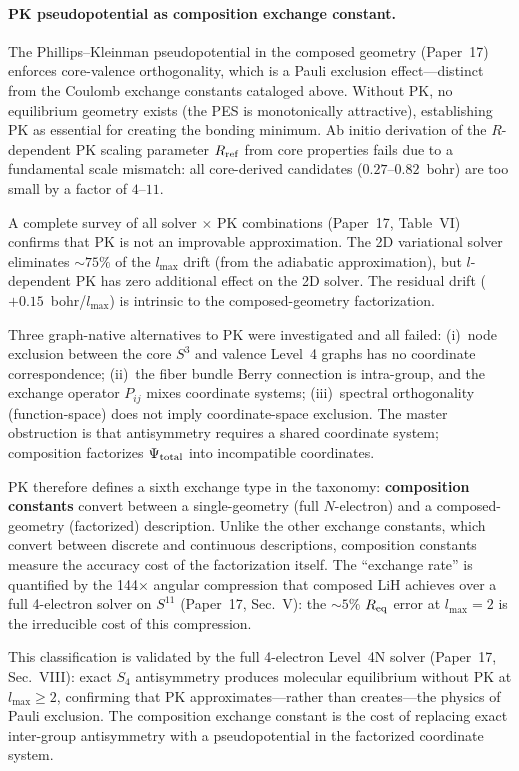 \documentclass[aps,pra,twocolumn,superscriptaddress,longbibliography]{revtex4-2}
\begin{document}
\paragraph{PK pseudopotential as composition exchange constant.}
The Phillips--Kleinman pseudopotential in the composed geometry
(Paper~17) enforces core-valence orthogonality, which is a
Pauli exclusion effect---distinct from the Coulomb exchange
constants cataloged above.  Without PK, no equilibrium
geometry exists (the PES is monotonically attractive), establishing
PK as essential for creating the bonding minimum.  Ab initio
derivation of the $R$-dependent PK scaling parameter $R_{\rm ref}$
from core properties fails due to a fundamental scale mismatch:
all core-derived candidates ($0.27$--$0.82$~bohr) are too small
by a factor of $4$--$11$.

A complete survey of all solver $\times$ PK combinations
(Paper~17, Table~VI) confirms that PK is not an improvable
approximation.  The 2D variational solver eliminates ${\sim}75\%$
of the $l_{\max}$ drift (from the adiabatic approximation), but
$l$-dependent PK has zero additional effect on the 2D solver.
The residual drift ($+0.15$~bohr/$l_{\max}$) is intrinsic to
the composed-geometry factorization.

Three graph-native alternatives to PK were investigated and all
failed: (i)~node exclusion between the core $S^3$ and valence
Level~4 graphs has no coordinate correspondence;
(ii)~the fiber bundle Berry connection is intra-group, and the
exchange operator $P_{ij}$ mixes coordinate systems;
(iii)~spectral orthogonality (function-space) does not imply
coordinate-space exclusion.  The master obstruction is that
antisymmetry requires a shared coordinate system; composition
factorizes $\Psi_{\rm total}$ into incompatible coordinates.

PK therefore defines a sixth exchange type in the taxonomy:
\textbf{composition constants} convert between a single-geometry
(full $N$-electron) and a composed-geometry (factorized) description.
Unlike the other exchange constants, which convert between discrete
and continuous descriptions, composition constants measure the
accuracy cost of the factorization itself.  The ``exchange rate''
is quantified by the 144$\times$ angular compression that composed
LiH achieves over a full 4-electron solver on $S^{11}$
(Paper~17, Sec.~V): the ${\sim}5\%$ $R_{\rm eq}$ error at
$l_{\max} = 2$ is the irreducible cost of this compression.

This classification is validated by the full 4-electron Level~4N
solver (Paper~17, Sec.~VIII): exact $S_4$ antisymmetry produces
molecular equilibrium without PK at $l_{\max} \geq 2$, confirming
that PK approximates---rather than creates---the physics of Pauli
exclusion.  The composition exchange constant is the cost of
replacing exact inter-group antisymmetry with a pseudopotential
in the factorized coordinate system.
\end{document}
